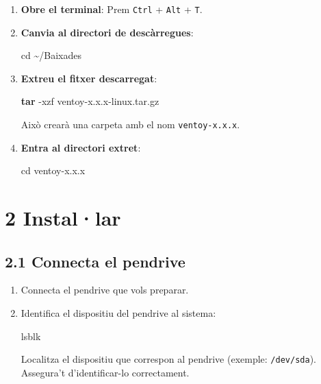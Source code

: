 \documentclass[
  a4paper,
]{article}
\newenvironment{Shaded}{\begin{snugshade}}{\end{snugshade}}
\newcommand{\AttributeTok}[1]{\textcolor[rgb]{0.13,0.29,0.53}{#1}}
\newcommand{\BuiltInTok}[1]{#1}
\newcommand{\ExtensionTok}[1]{#1}
\newcommand{\FunctionTok}[1]{\textcolor[rgb]{0.13,0.29,0.53}{\textbf{#1}}}
\newcommand{\NormalTok}[1]{#1}
\begin{document}
\begin{enumerate}
\def\labelenumi{\arabic{enumi}.}
\item
  \textbf{Obre el terminal}: Prem \texttt{Ctrl} + \texttt{Alt} +
  \texttt{T}.
\item
  \textbf{Canvia al directori de descàrregues}:

\begin{Shaded}
\begin{Highlighting}[]
\BuiltInTok{cd}\NormalTok{ \textasciitilde{}/Baixades}
\end{Highlighting}
\end{Shaded}
\item
  \textbf{Extreu el fitxer descarregat}:

\begin{Shaded}
\begin{Highlighting}[]
\FunctionTok{tar} \AttributeTok{{-}xzf}\NormalTok{ ventoy{-}x.x.x{-}linux.tar.gz}
\end{Highlighting}
\end{Shaded}

  Això crearà una carpeta amb el nom \texttt{ventoy-x.x.x}.
\item
  \textbf{Entra al directori extret}:

\begin{Shaded}
\begin{Highlighting}[]
\BuiltInTok{cd}\NormalTok{ ventoy{-}x.x.x}
\end{Highlighting}
\end{Shaded}
\end{enumerate}

\section{2 Instal·lar}\label{installar}

\subsection{2.1 Connecta el pendrive}\label{connecta-el-pendrive}

\begin{enumerate}
\def\labelenumi{\arabic{enumi}.}
\item
  Connecta el pendrive que vols preparar.
\item
  Identifica el dispositiu del pendrive al sistema:

\begin{Shaded}
\begin{Highlighting}[]
\ExtensionTok{lsblk}
\end{Highlighting}
\end{Shaded}

  Localitza el dispositiu que correspon al pendrive (exemple:
  \texttt{/dev/sda}). Assegura't d'identificar-lo correctament.
\end{enumerate}
\end{document}
